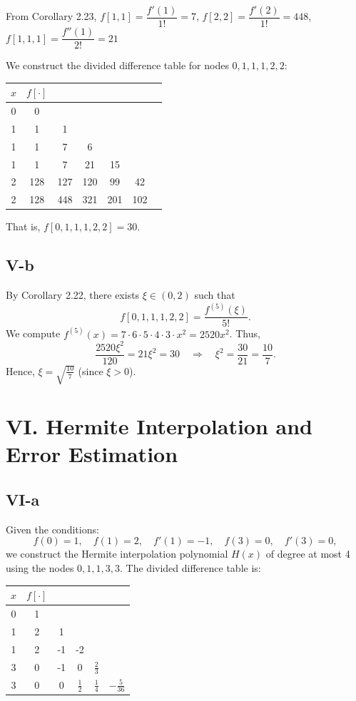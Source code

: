 \documentclass[a4paper]{article}
\begin{document}
From Corollary 2.23, $f[1, 1] = \dfrac{f'(1)}{1!} = 7$, $f[2, 2] = \dfrac{f'(2)}{1!} = 448$, $f[1, 1, 1] = \dfrac{f''(1)}{2!} = 21$

We construct the divided difference table for nodes \( 0, 1, 1, 1, 2, 2 \):

\begin{center}
\begin{tabular}{c|cccccc}
$x$ & $f[\cdot]$ & & & & & \\
\hline
0 & 0 \\
1 & 1 & 1 \\
1 & 1 & 7 & 6 \\
1 & 1 & 7 & 21 & 15\\
2 & 128 & 127 & 120 & 99 & 42\\
2 & 128 & 448 & 321 & 201 & 102 \\
\end{tabular}
\end{center}

That is, \( f[0,1,1,1,2,2] = 30 \).

\subsection*{V-b}

By Corollary 2.22, there exists \( \xi \in (0,2) \) such that
\[
f[0,1,1,1,2,2] = \frac{f^{(5)}(\xi)}{5!}.
\]
We compute \( f^{(5)}(x) = 7 \cdot 6 \cdot 5 \cdot 4 \cdot 3 \cdot x^2 = 2520 x^2 \). Thus,
\[
\frac{2520 \xi^2}{120} = 21 \xi^2 = 30 \quad \Rightarrow \quad \xi^2 = \frac{30}{21} = \frac{10}{7}.
\]
Hence, \( \xi = \sqrt{\frac{10}{7}} \) (since \( \xi > 0 \)).

\section*{VI. Hermite Interpolation and Error Estimation}

\subsection*{VI-a}

Given the conditions:
\[
f(0) = 1, \quad f(1) = 2, \quad f'(1) = -1, \quad f(3) = 0, \quad f'(3) = 0,
\]
we construct the Hermite interpolation polynomial \( H(x) \) of degree at most 4 using the nodes \( 0, 1, 1, 3, 3 \). The divided difference table is:

\begin{center}
\begin{tabular}{c|ccccc}
$x$ & $f[\cdot]$ & & & & \\
\hline
0 & 1 \\
1 & 2 & 1 \\
1 & 2 & -1 & -2 \\
3 & 0 & -1 & 0 & $\frac23$ \\
3 & 0 & 0 & $\frac12$ & $\frac14$ & $-\frac{5}{36}$\\
\end{tabular}
\end{center}
\end{document}
